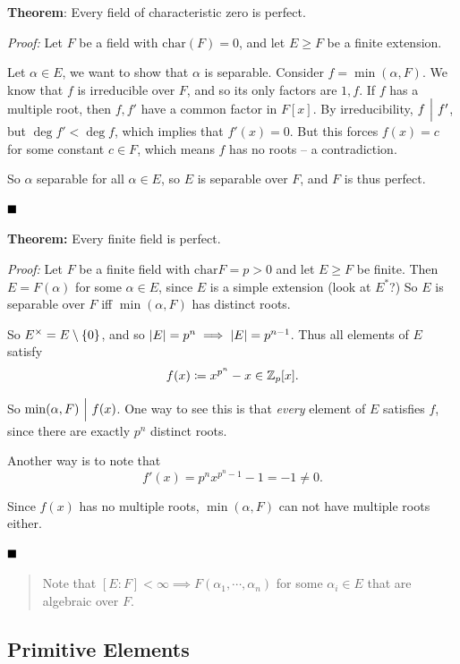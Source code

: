 \textbf{Theorem}: Every field of characteristic zero is perfect.

\emph{Proof:} Let \(F\) be a field with \(\mathrm{char}(F) = 0\), and
let \(E \geq F\) be a finite extension.

Let \(\alpha \in E\), we want to show that \(\alpha\) is separable.
Consider \(f = \min(\alpha, F)\). We know that \(f\) is irreducible over
\(F\), and so its only factors are \(1, f\). If \(f\) has a multiple
root, then \(f, f'\) have a common factor in \(F[x]\). By
irreducibility, \(f {~\Bigm| ~} f'\), but \(\deg f' < \deg f\), which
implies that \(f'(x) = 0\). But this forces \(f(x) = c\) for some
constant \(c\in F\), which means \(f\) has no roots -- a contradiction.

So \(\alpha\) separable for all \(\alpha \in E\), so \(E\) is separable
over \(F\), and \(F\) is thus perfect.

\(\qed\)

\textbf{Theorem:} Every finite field is perfect.

\emph{Proof:} Let \(F\) be a finite field with
\(\mathrm{char} F = p > 0\) and let \(E \geq F\) be finite. Then
\(E = F(\alpha)\) for some \(\alpha\in E\), since \(E\) is a simple
extension (look at \(E^*\)?) So \(E\) is separable over \(F\) iff
\(\min(\alpha, F)\) has distinct roots.

So \(E^{\times} = E\setminus\left\{{0}\right\}\), and so
\({\left\lvert {E} \right\rvert} = p^n \implies {\left\lvert {E} \right\rvert} = p^{n-1}\). Thus all elements of \(E\)
satisfy \[
f(x) \coloneqq x^{p^n} - x \in {\mathbb{Z}}_p[x]
.\]

So \(\min(\alpha, F) {~\Bigm| ~} f(x)\). One way to see this is that
\emph{every} element of \(E\) satisfies \(f\), since there are exactly
\(p^n\) distinct roots.

Another way is to note that \[
f'(x) = p^nx^{p^n - 1} - 1 = -1 \neq 0
.\]

Since \(f(x)\) has no multiple roots, \(\min(\alpha, F)\) can not have
multiple roots either.

\(\qed\)

\begin{quote}
Note that \([E: F] < \infty \implies F(\alpha_1, \cdots, \alpha_n)\) for
some \(\alpha_i \in E\) that are algebraic over \(F\).
\end{quote}

\hypertarget{primitive-elements}{%
\subsection{Primitive Elements}\label{primitive-elements}}

